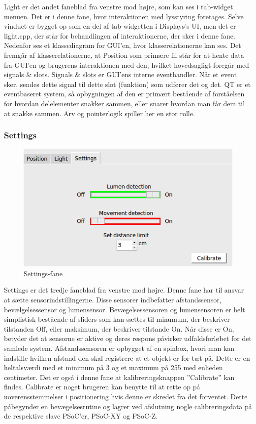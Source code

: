 Light er det andet faneblad fra venstre mod højre, som kan ses i tab-widget menuen. Det er i denne fane, hvor interaktionen med lysstyring foretages. Selve vinduet er bygget op som en del af tab-widgetten i Displays's UI, men det er light.cpp, der står for behandlingen af interaktionerne, der sker i denne fane. 
Nedenfor ses et klassediagram for GUI'en, hvor klasserelationerne kan ses. Det fremgår af klasserelationerne, at Position som primære fil står for at hente data fra GUI'en og brugerens interaktionen med den, hvilket hovedsagligt foregår med signals \& slots. Signals \& slots er GUI'ens interne eventhandler. Når et event sker, sendes dette signal til dette slot (funktion) som udfører det og det. QT er et eventbaseret system, så opbygningen af den er primært bestående af forståelsen for hvordan delelementer snakker sammen, eller snarer hvordan man får dem til at snakke sammen. Arv og pointerlogik spiller her en stor rolle.

\subsubsection{Settings}

\begin{figure}[H]
\centering
\includegraphics[width=0.9\linewidth]{0_Filer/Figuer/Settings.png}
\caption{Settings-fane}
\label{fig:GUI Settings}
\end{figure}

Settings er det tredje faneblad fra venstre mod højre. Denne fane har til ansvar at sætte sensorindstillingerne. Disse sensorer indbefatter afstandssensor, bevælgelsessensor og lumensensor. Bevægelsessensoren og lumensensoren er helt simplistisk bestående af sliders som kan sættes til minumum, der beskriver tilstanden Off, eller maksimum, der beskriver tilstande On. Når disse er On, betyder det at sensorne er aktive og deres respons påvirker udfaldsforløbet for det samlede system. Afstandssensoren er opbygget af en spinbox, hvori man kan indstille hvilken afstand den skal registrere at et objekt er for tæt på. Dette er en heltalsværdi med et minimum på 3 og et maximum på 255 med enheden centimeter. Det er også i denne fane at kalibreringsknappen ”Calibrate” kan findes. Calibrate er noget brugeren kan benytte til at rette op på uoverensstemmelser i positionering hvis denne er skredet fra det forventet. Dette påbegynder en bevægelsesrutine og lagrer ved afslutning nogle calibreringsdata på de respektive slave PSoC'er, PSoC-XY og PSoC-Z.

